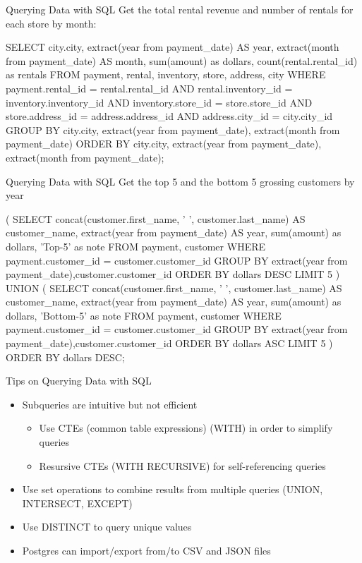 \documentclass[ignorenonframetext,xcolor=x11names]{beamer}
\begin{document}
\begin{frame}[fragile]{Querying Data with SQL}
Get the total rental revenue and number of rentals for each store by month:
\scriptsize
\begin{sqlcode}
SELECT city.city, 
       extract(year from payment_date) AS year, 
       extract(month from payment_date) AS month, 
       sum(amount) as dollars, 
       count(rental.rental_id) as rentals
FROM payment, rental, inventory, store, address, city
WHERE payment.rental_id = rental.rental_id AND
      rental.inventory_id = inventory.inventory_id AND
      inventory.store_id = store.store_id AND
      store.address_id = address.address_id AND
      address.city_id = city.city_id
GROUP BY city.city, 
         extract(year from payment_date), 
         extract(month from payment_date)
ORDER BY city.city, 
         extract(year from payment_date), 
         extract(month from payment_date);
\end{sqlcode}
\end{frame}

\begin{frame}[fragile]{Querying Data with SQL}
Get the top 5 and the bottom 5 grossing customers by year
\scriptsize
\begin{sqlcode}
( SELECT concat(customer.first_name, ' ', 
             customer.last_name) AS customer_name,
       extract(year from payment_date) AS year, 
       sum(amount) as dollars,
       'Top-5' as note
FROM payment, customer
WHERE payment.customer_id = customer.customer_id
GROUP BY extract(year from payment_date),customer.customer_id
ORDER BY dollars DESC LIMIT 5
) UNION (
SELECT concat(customer.first_name, ' ', 
           customer.last_name) AS customer_name,
       extract(year from payment_date) AS year, 
       sum(amount) as dollars,
       'Bottom-5' as note
FROM payment, customer
WHERE payment.customer_id = customer.customer_id
GROUP BY extract(year from payment_date),customer.customer_id
ORDER BY dollars ASC LIMIT 5 ) 
ORDER BY dollars DESC;
\end{sqlcode}
\end{frame}

\begin{frame}{Tips on Querying Data with SQL}
\begin{itemize}
  \item Subqueries are intuitive but not efficient
  \begin{itemize}
    \item Use CTEs (common table expressions) (WITH) in order to simplify queries
    \item Resursive CTEs (WITH RECURSIVE) for self-referencing queries
  \end{itemize}
  \item Use set operations to combine results from multiple queries (UNION, INTERSECT, EXCEPT)
  \item Use DISTINCT to query unique values
  \item Postgres can import/export from/to CSV and JSON files
\end{itemize}
\end{frame}
\end{document}
